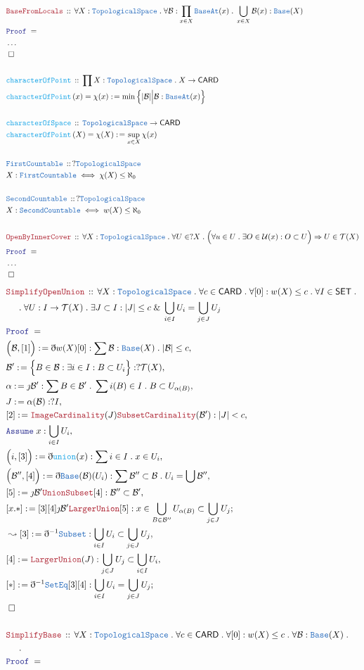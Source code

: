 \documentclass[12pt]{scrartcl}
\newcommand{\TYPE}[1]{\textcolor{NavyBlue}{\mathtt{#1}}}
\newcommand{\FUNC}[1]{\textcolor{Cerulean}{\mathtt{#1}}}
\newcommand{\LOGIC}[1]{\textcolor{Blue}{\mathtt{#1}}}
\newcommand{\THM}[1]{\textcolor{Maroon}{\mathtt{#1}}}
\renewcommand{\.}{\; . \;}
\newcommand{\de}{: \kern 0.1pc =}
\newcommand{\Act}[1]{\left( #1 \right)}
\newcommand{\Theorem}[2]{& \THM{#1} \, :: \, #2 \\ & \Proof = \\ }
\newcommand{\DeclareType}[2]{& \TYPE{#1} \, :: \, #2 \\}
\newcommand{\DefineType}[3]{& #1 : \TYPE{#2} \iff #3 \\}
\newcommand{\DeclareFunc}[2]{& \FUNC{#1} \, :: \, #2 \\}
\newcommand{\DefineNamedFunc}[4]{&  \FUNC{#1}\Act{#2} = #3 \de #4 \\}
\newcommand{\NewLine}{\\ & \kern 1pc}
\newcommand{\Page}[1]{ \begin{align*} #1 \end{align*}   }
\newcommand{ \bd }{ \ByDef }
\newcommand{\NoProof}{ & \ldots \\ \EndProof}
\renewcommand{\And}{\; \& \;}
\newcommand{\Imply}{\Rightarrow}
\newcommand{\Say}[3]{& #1 \de #2 : #3, \\}
\newcommand{\Conclude}[3]{& #1 \de #2 : #3; \\}
\newcommand{\Derive}[3]{& \leadsto #1 \de #2 : #3, \\}
\newcommand{\Assume}[2]{& \LOGIC{Assume} \; #1 : #2, \\}
\newcommand{\QED}{\; \square}
\newcommand{\EndProof}{& \QED \\}
\newcommand{\ByDef}{\eth}
\newcommand{\ByConstr}{\jmath}
\newcommand{\Proof}{\LOGIC{Proof} \; }
\newcommand{\B}{\mathcal{B}}
\newcommand{\SET}{\mathsf{SET}}
\newcommand{\TS}{\TYPE{TopologicalSpace}}
\newcommand{\T}{\mathcal{T}}
\newcommand{\U}{\mathcal{U}}
\begin{document}
\Page{
	\Theorem{BaseFromLocals}
	{
		\forall X : \TS \. 
		\forall \B : \prod_{x \in X} \TYPE{BaseAt}(x) \.
		\bigcup_{x \in X} \B(x) : \TYPE{Base}(X)
	}
	\NoProof
	\\
	\DeclareFunc{characterOfPoint}
	{
		\prod X : \TS \.
		X \to \mathsf{CARD}
	}
	\DefineNamedFunc{characterOfPoint}{x}{\chi(x)}
	{
		\min\Big\{ |\B| \Big| \B : \TYPE{BaseAt}(x) \Big\}
	}
	\\
	\DeclareFunc{characterOfSpace}
	{
		\TS \to \mathsf{CARD}
	}
	\DefineNamedFunc{characterOfPoint}{X}{\chi(X)}
	{
		\sup_{x \in X} \chi(x)
	}
	\\
	\DeclareType{FirstCountable}{?\TS}
	\DefineType{X}{FirstCountable}{\chi(X) \le \aleph_0}
	\\
	\DeclareType{SecondCountable}{?\TS}
	\DefineType{X}{SecondCountable}{w(X) \le \aleph_0}
	\\
	\Theorem{OpenByInnerCover}
	{
		\forall X : \TS \.
		\forall U \in ?X \.
		\Big( \forall u \in U \. \exists O \in \U(x) : O \subset U \Big)
		\Imply
		U \in \T(X)
	}
	\NoProof
}\Page{
	\Theorem{SimplifyOpenUnion}
	{
		\forall X : \TS \.
		\forall c \in \mathsf{CARD} \. 
		\forall [0] : w(X) \le c \.
		\forall  I \in \SET \. \NewLine \. 
		\forall U : I \to \T(X) \.
		\exists J \subset I :
		|J| \le c \And \bigcup_{i \in I} U_i = \bigcup_{j \in J} U_j 
	}
	\Say{\Big(\B,[1]\Big)}{\bd w(X) [0]}
	{
		\sum \B : \TYPE{Base}(X) \. |\B| \le c
	}
	\Say{\B'}{\Big\{ B \in \B : \exists i \in I : B \subset U_i  \Big\}}
	{  ?\T(X)  }
	\Say{\alpha}{\ByConstr \B'}
	{\sum B \in \B' \. \sum i(B) \in I \. B \subset U_{\alpha(B)}} 	
	\Say{J}{\alpha(\B)}{?I}
	\Say{[2]}{\THM{ImageCardinality}(J)\THM{SubsetCardinality}(\B')}
	{ |J| < c  }
	\Assume{x}{\bigcup_{i \in I} U_i}
	\Say{\Big(i,[3]\Big)}{\bd \FUNC{union}(x)}{\sum i \in I \. x \in U_i}
	\Say{\Big(\B'',[4]\Big)}{\bd \TYPE{Base}(\B)(U_i)}
	{
		\sum \B'' \subset \B \. U_i = \bigcup \B'' 
	}
	\Say{[5]}{\ByConstr \B' \THM{UnionSubset}[4]}{\B'' \subset \B'}
	\Conclude{[x.*]}{[3][4]\ByConstr \B' \THM{LargerUnion}[5]}{
		x \in \bigcup_{B \in \B''} U_{\alpha(B)} 
		\subset \bigcup_{j \in J} U_j 
	}
	\Derive{[3]}{\bd^{-1}\TYPE{Subset}}
	{\bigcup_{i \in I} U_i \subset \bigcup_{j \in J} U_j}
	\Say{[4]}{\THM{LargerUnion}(J)}{\bigcup_{j \in J} U_j \subset \bigcup_{i \in I} U_i}
	\Conclude{[*]}{\bd^{-1}\TYPE{SetEq}[3][4]}
	{\bigcup_{i \in I}U_i = \bigcup_{j \in J}U_j}
	\EndProof
	\\
	\Theorem{SimplifyBase}
	{
		\forall X : \TS \.
		\forall c \in \mathsf{CARD} \. 
		\forall [0] : w(X) \le c \.
		\forall  \B :  \TYPE{Base}(X) \. \NewLine \. 
}}
\end{document}
